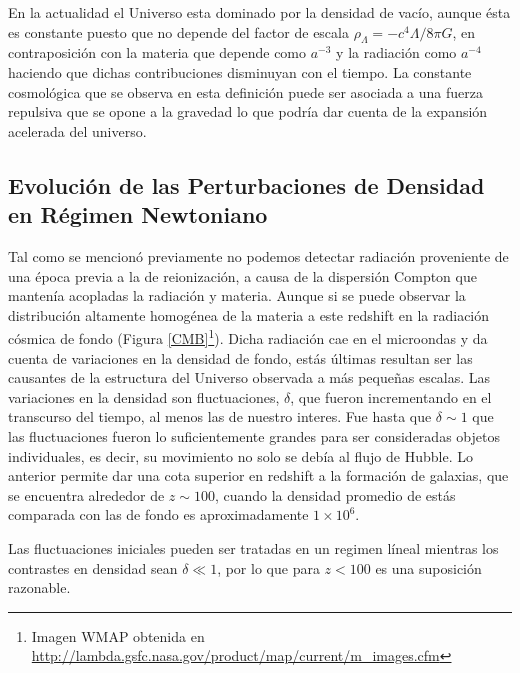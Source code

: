 \documentclass[a4,useAMS,usenatbib,usegraphicx,12pt]{article}
\begin{document}
En la actualidad el Universo esta dominado por la densidad de vacío, aunque ésta 
es constante puesto que no depende del factor de escala $\rho_{\Lambda}=-c^4\Lambda/8\pi G$,
en contraposición con la materia que depende como $a^{-3}$ y la radiación como $a^{-4}$ 
haciendo que dichas contribuciones disminuyan con el tiempo. 
La constante cosmológica que se observa en esta definición puede ser asociada a una fuerza 
repulsiva que se opone a la gravedad lo que podría dar cuenta de la expansi\'on 
acelerada del universo. 

	
\subsection*{Evolución de las Perturbaciones de Densidad en Régimen Newtoniano}

Tal como se mencionó previamente no podemos detectar radiación proveniente 
de una época previa a la de reionización, a causa de la dispersión Compton
que mantenía acopladas la radiación y materia.
Aunque si se puede observar la distribución altamente homogénea de la materia
a este redshift en la radiación cósmica de fondo (Figura \ref{CMB}\footnote{
Imagen WMAP obtenida en \url{http://lambda.gsfc.nasa.gov/product/map/current/m_images.cfm}}).  
Dicha radiación cae en el microondas y da cuenta de variaciones 
en la densidad de fondo, estás últimas resultan ser las causantes de 
la estructura del Universo observada a más pequeñas escalas.
Las variaciones en la densidad son fluctuaciones, $\delta$, que fueron 
incrementando en el transcurso del tiempo, al menos las de nuestro
interes. 
Fue hasta que $\delta\sim 1$  que las fluctuaciones fueron lo 
suficientemente grandes para ser consideradas objetos indi\-vi\-dua\-les, es decir,
su movimiento no solo se debía al flujo de Hubble. 
Lo anterior permite dar una cota superior en redshift a la formación de galaxias, 
que se encuentra alrededor de $z\sim 100$, cuando la densidad promedio de estás 
comparada con las de fondo es aproximadamente $1\times 10^6$. 

Las fluctuaciones iniciales pueden ser tratadas en un regimen líneal mientras 
los contrastes en densidad sean $\delta\ll 1$, por lo que para $z<100$ es una 
suposición razonable. 

\end{document}
